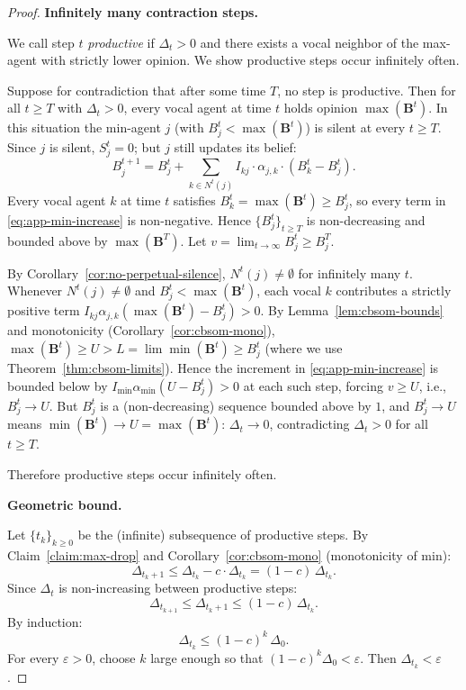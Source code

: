\begin{proof}
  \medskip\noindent\textbf{Infinitely many contraction steps.}

  We call step $t$ \emph{productive} if $\Delta_t>0$ and there exists a
  vocal neighbor of the max-agent with strictly lower opinion.
  We show productive steps occur infinitely often.

  Suppose for contradiction that after some time $T$, no step is
  productive.  Then for all $t\ge T$ with $\Delta_t>0$, every vocal
  agent at time $t$ holds opinion $\max(\mathbf{B}^t)$.
  In this situation the min-agent $j$ (with $B_j^t<\max(\mathbf{B}^t)$)
  is silent at every $t\ge T$.
  Since $j$ is silent, $S_j^t=0$; but $j$ still updates its belief:
  \begin{equation}\label{eq:app-min-increase}
    B_j^{t+1}
    = B_j^t + \sum_{k\in N^t(j)}
        I_{kj}\cdot\alpha_{j,k}\cdot(B_k^t-B_j^t).
  \end{equation}
  Every vocal agent $k$ at time $t$ satisfies $B_k^t=\max(\mathbf{B}^t)\ge B_j^t$,
  so every term in \eqref{eq:app-min-increase} is non-negative.
  Hence $\{B_j^t\}_{t\ge T}$ is non-decreasing and bounded above by
  $\max(\mathbf{B}^T)$.  Let $v=\lim_{t\to\infty}B_j^t\ge B_j^T$.

  By Corollary~\ref{cor:no-perpetual-silence}, $N^t(j)\ne\emptyset$
  for infinitely many $t$.  Whenever $N^t(j)\ne\emptyset$ and
  $B_j^t<\max(\mathbf{B}^t)$, each vocal $k$ contributes a strictly
  positive term $I_{kj}\alpha_{j,k}(\max(\mathbf{B}^t)-B_j^t)>0$.
  By Lemma~\ref{lem:cbsom-bounds} and monotonicity
  (Corollary~\ref{cor:cbsom-mono}),
  $\max(\mathbf{B}^t)\ge U>L=\lim\min(\mathbf{B}^t)\ge B_j^t$
  (where we use Theorem~\ref{thm:cbsom-limits}).
  Hence the increment in \eqref{eq:app-min-increase} is bounded
  below by $I_{\min}\alpha_{\min}(U-B_j^t)>0$ at each such step,
  forcing $v\ge U$, i.e., $B_j^t\to U$.
  But $B_j^t$ is a (non-decreasing) sequence bounded above by $1$,
  and $B_j^t\to U$ means $\min(\mathbf{B}^t)\to U=\max(\mathbf{B}^t)$:
  $\Delta_t\to 0$, contradicting $\Delta_t>0$ for all $t\ge T$.

  Therefore productive steps occur infinitely often.

  \medskip\noindent\textbf{Geometric bound.}

  Let $\{t_k\}_{k\ge 0}$ be the (infinite) subsequence of productive
  steps.  By Claim~\ref{claim:max-drop} and
  Corollary~\ref{cor:cbsom-mono} (monotonicity of min):
  \[\Delta_{t_k+1}\le \Delta_{t_k}-c\cdot \Delta_{t_k}=(1-c)\,\Delta_{t_k}.\]
  Since $\Delta_t$ is non-increasing between productive steps:
  \[\Delta_{t_{k+1}}\le \Delta_{t_k+1}\le(1-c)\,\Delta_{t_k}.\]
  By induction:
  \[\Delta_{t_k}\le(1-c)^k\,\Delta_0.\]
  For every $\varepsilon>0$, choose $k$ large enough so that
  $(1-c)^k \Delta_0<\varepsilon$.
  Then $\Delta_{t_k}<\varepsilon$.
\end{proof}
